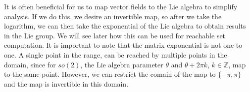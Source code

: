 \documentclass{book}
\begin{document}
It is often beneficial for us to map vector fields to the Lie algebra to simplify
analysis. If we do this, we desire an invertible map, so after we take the logarithm,
we can then take the exponential of the Lie algebra to obtain results in the Lie group.
We will see later how this can be used for reachable set computation. It is important
to note that the matrix exponential is not one to one. A single point in the range, can be
reached by multiple points in the domain, since for $so(2)$, the Lie algebra parameter $\theta$ 
and $\theta + 2\pi k$, $k\in \mathbb{Z}$, map to the same point. However, we can restrict the
comain of the map to $\{-\pi, \pi\}$ and the map is invertible in this domain.
\end{document}

